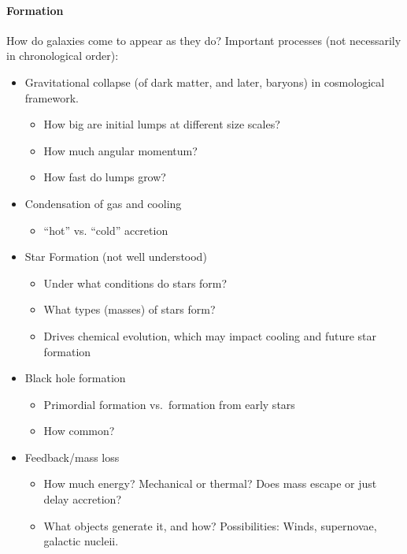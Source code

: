 \documentclass{article}
\begin{document}
\paragraph{Formation}
How do galaxies come to appear as they do?
Important processes (not necessarily in chronological order):
\begin{itemize}
    \item Gravitational collapse (of dark matter, and later, baryons)
        in cosmological framework.
        \begin{itemize}
            \item How big are initial lumps at different size scales?
            \item How much angular momentum?
            \item How fast do lumps grow?
        \end{itemize}
    \item Condensation of gas and cooling
        \begin{itemize}
            \item ``hot'' vs. ``cold'' accretion
        \end{itemize}
    \item Star Formation (not well understood)
        \begin{itemize}
            \item Under what conditions do stars form?
            \item What types (masses) of stars form?
            \item Drives chemical evolution, which may impact
                cooling and future star formation
        \end{itemize}
    \item Black hole formation
        \begin{itemize}
            \item Primordial formation vs.\ formation from early stars
            \item How common?
        \end{itemize}
    \item Feedback/mass loss
        \begin{itemize}
            \item How much energy? Mechanical or thermal?
                Does mass escape or just delay accretion?
            \item What objects generate it, and how? Possibilities:
                Winds, supernovae, galactic nucleii.
        \end{itemize}

\end{itemize}
\end{document}
